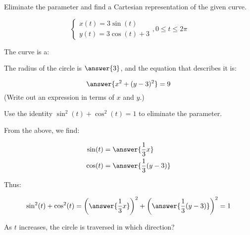 \documentclass{ximera}
\author{Jim Talamo and Nick Hemleben}
\begin{document}
\begin{exercise}
Eliminate the parameter and find a Cartesian representation of the given curve.

\[
\begin{cases}
x(t) =  3 \sin (t) \\
y(t) =  3 \cos(t)+3
\end{cases}
, 0 \leq t \leq 2\pi
\]

The curve is a:

\begin{multipleChoice}
\end{multipleChoice}

The radius of the circle is $\answer{3}$, and the equation that describes it is:

\[
 \answer{ x^2 + (y-3)^2 } = 9
\]
(Write out an expression in terms of $x$ and $y$.)
\begin{hint}
Use the identity $\sin^2(t)+\cos^2(t) =1$ to eliminate the parameter.  

From the above, we find:

\begin{align*}
\sin(t) &= \answer{\frac{1}{3}x} \\ 
\cos(t) &= \answer{\frac{1}{3}(y-3)}
\end{align*}

Thus:

\[
\sin^2(t) + \cos^2(t) = \left(\answer{\frac{1}{3}x}\right)^2+ \left(\answer{\frac{1}{3}(y-3)}\right)^2 =1
\]
\end{hint}

As $t$ increases, the circle is traversed in which direction?
\begin{multipleChoice}
\end{multipleChoice}
\end{exercise}
\end{document}
